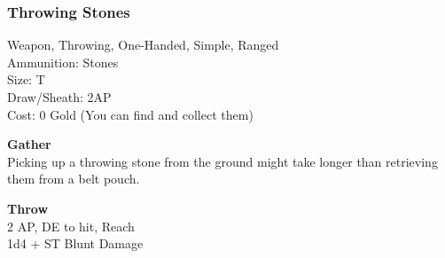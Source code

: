 \subsubsection{Throwing Stones}\label{weapon:throwingStones}
Weapon, Throwing, One-Handed, Simple, Ranged\\
Ammunition: Stones\\
Size: T\\
Draw/Sheath: 2AP\\
Cost: 0 Gold (You can find and collect them)

\textbf{Gather}\\
Picking up a throwing stone from the ground might take longer than retrieving them from a belt pouch.

\textbf{Throw}\\
2 AP, DE to hit,  Reach\\
1d4 + \texttimes ST Blunt Damage

